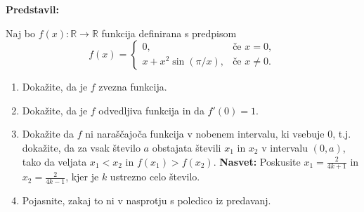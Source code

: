 \textbf{Predstavil:} 

Naj bo $f(x): \mathbb{R} \to \mathbb{R}$ funkcija definirana s predpisom
\[
f(x) = 
\begin{cases}
  0, & \text{če } x=0, \\
  x + x^{2}\sin(\pi/x), & \text{če } x \neq 0.
\end{cases}
\]

\begin{enumerate}
  \item Dokažite, da je $f$ zvezna funkcija.
  \item Dokažite, da je $f$ odvedljiva funkcija in da $f'(0) = 1$.
  \item Dokažite da $f$ ni naraščajoča funkcija v nobenem intervalu, ki vsebuje $0$, t.j. dokažite, da za vsak število $a$ obstajata števili $x_1$ in $x_2$ v intervalu $(0,a)$, tako da veljata $x_{1} < x_{2}$ in $f(x_{1}) > f(x_{2})$. \textbf{Nasvet:} Poskusite $x_1 = \frac{2}{4k+1}$ in $x_2 = \frac{2}{4k-1}$, kjer je $k$  ustrezno celo število. 
  \item Pojasnite, zakaj to ni v nasprotju s poledico iz predavanj.
\end{enumerate}
